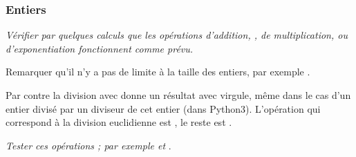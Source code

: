 \subsubsection{Entiers}
\begin{Exercise}
{\it Vérifier par quelques calculs que les opérations d'addition, \type{+}, de multiplication, \type{*} ou d'exponentiation \type{**} fonctionnent comme prévu.

Remarquer qu'il n'y a pas de limite à la taille des entiers, par exemple .}
\end{Exercise}
\medskip

Par contre la division avec \type{/} donne un résultat avec virgule, même dans le cas d'un entier divisé par un diviseur de cet entier (dans Python3).
L'opération qui correspond à la division euclidienne est \type{/\!/}, le reste est . 
\begin{Exercise}
{\it Tester ces opérations ; par exemple  et }.
\end{Exercise}
